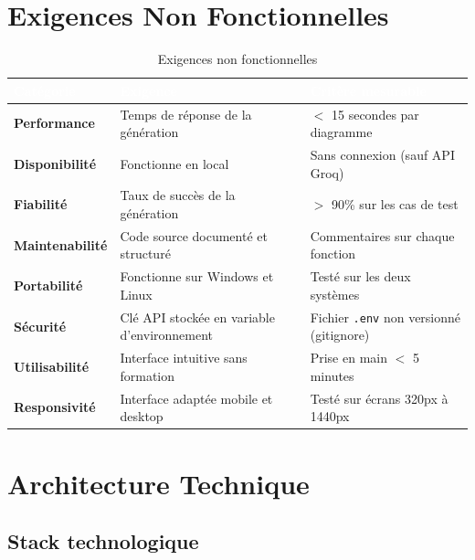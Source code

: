 \documentclass[12pt,a4paper]{article}
\begin{document}
\section{Exigences Non Fonctionnelles}

\begin{table}[H]
\centering
\renewcommand{\arraystretch}{1.3}
\begin{tabularx}{\textwidth}{|l|X|X|}
\hline
\rowcolor{darkblue!90}
\textcolor{white}{\textbf{Catégorie}} &
\textcolor{white}{\textbf{Exigence}} &
\textcolor{white}{\textbf{Critère mesurable}} \\
\hline
\textbf{Performance} & Temps de réponse de la génération & $<$ 15 secondes par diagramme \\
\hline
\rowcolor{lightgray}
\textbf{Disponibilité} & Fonctionne en local & Sans connexion (sauf API Groq) \\
\hline
\textbf{Fiabilité} & Taux de succès de la génération & $>$ 90\% sur les cas de test \\
\hline
\rowcolor{lightgray}
\textbf{Maintenabilité} & Code source documenté et structuré & Commentaires sur chaque fonction \\
\hline
\textbf{Portabilité} & Fonctionne sur Windows et Linux & Testé sur les deux systèmes \\
\hline
\rowcolor{lightgray}
\textbf{Sécurité} & Clé API stockée en variable d'environnement & Fichier \texttt{.env} non versionné (gitignore) \\
\hline
\textbf{Utilisabilité} & Interface intuitive sans formation & Prise en main $<$ 5 minutes \\
\hline
\rowcolor{lightgray}
\textbf{Responsivité} & Interface adaptée mobile et desktop & Testé sur écrans 320px à 1440px \\
\hline
\end{tabularx}
\caption{Exigences non fonctionnelles}
\end{table}

\clearpage
\section{Architecture Technique}

\subsection{Stack technologique}
\end{document}
